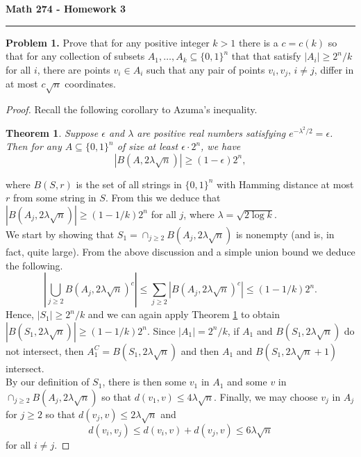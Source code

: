 \documentclass[11pt,letterpaper]{report}
\theoremstyle{plain}
\newtheorem{theorem}{Theorem}[section]
\begin{document}
\begin{center}
{\bf \Large Math 274 - Homework 3}
\vspace{0.2cm}
\hrule
\end{center}

\noindent\textbf{Problem 1. }
Prove that for any positive integer $k>1$ there is a $c = c(k)$ so that for any collection of subsets $A_1, \ldots, A_k\subseteq \{0, 1\}^n$ that that satisfy $|A_i| \geq 2^n/k$ for all $i$, there are points $v_i\in A_i$ such that any pair of points $v_i, v_j$, $i\neq j$, differ in at most $c\sqrt{n}$ coordinates.



\begin{proof}
    Recall the following corollary to Azuma's inequality.
    \begin{theorem}\label{thm: Ham}
        Suppose $\epsilon$ and $\lambda$ are positive real numbers satisfying $e^{-\lambda^2/2} = \epsilon$.
        Then for any $A\subseteq \{0,1\}^n$ of size at least $\epsilon\cdot 2^n$, we have
        \[
            |B(A, 2\lambda \sqrt{n})| \geq (1-\epsilon)2^n,
        \]
    \end{theorem}
    where $B(S, r)$ is the set of all strings in $\{0,1\}^n$ with Hamming distance at most $r$ from some string in $S$.
    From this we deduce that $|B(A_j, 2\lambda \sqrt{n})| \geq (1-1/k)2^n$ for all $j$, where $\lambda = \sqrt{2\log k}$.\\

    We start by showing that $S_1 = \cap_{j\geq 2} B(A_j, 2\lambda \sqrt{n})$ is nonempty (and is, in fact, quite large).
    From the above discussion and a simple union bound we deduce the following.
    \[
        \left|\bigcup_{j\geq 2}B(A_j, 2\lambda \sqrt{n})^c\right| \leq \sum_{j\geq 2}|B(A_j, 2\lambda \sqrt{n})^c| \leq (1-1/k)2^n.
    \]
    Hence, $|S_1| \geq 2^n/k$ and we can again apply Theorem \ref{thm: Ham} to obtain $|B(S_1, 2\lambda \sqrt{n})| \geq (1-1/k)2^n$.
    Since $|A_1| = 2^n/k$, if $A_1$ and $B(S_1, 2\lambda \sqrt{n})$ do not intersect, then $A_1^C = B(S_1, 2\lambda\sqrt{n})$ and then $A_1$ and $B(S_1, 2\lambda\sqrt{n}+1)$ intersect.\\

    By our definition of $S_1$, there is then some $v_1$ in $A_1$ and some $v$ in $\cap_{j\geq 2}B(A_j, 2\lambda \sqrt{n})$ so that $d(v_1, v) \leq 4\lambda \sqrt{n}$.
    Finally, we may choose $v_j$ in $A_j$ for $j\geq 2$ so that $d(v_j, v)\leq 2\lambda\sqrt{n}$ and
    \[
        d(v_i, v_j) \leq d(v_i, v) + d(v_j, v) \leq 6\lambda \sqrt{n}
    \]
    for all $i\neq j$.
\end{proof}
\end{document}
